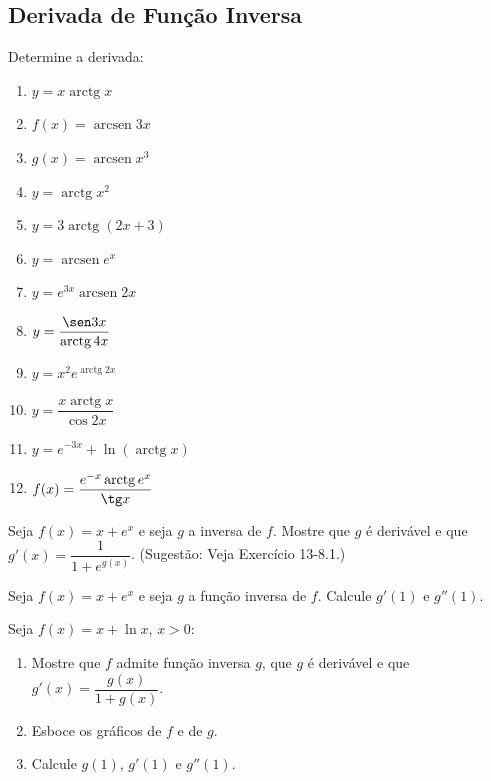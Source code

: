 \subsection{Derivada de Função Inversa}

\begin{exercicio}[1]
Determine a derivada:
\begin{enumerate}[label=\alph*)]
    \item $y = x\operatorname{arctg} x$
    \item $f(x) = \operatorname{arcsen} 3x$
    \item $g(x) = \operatorname{arcsen} x^3$
    \item $y = \operatorname{arctg} x^2$
    \item $y = 3\operatorname{arctg}(2x + 3)$
    \item $y = \operatorname{arcsen} e^x$
    \item $y = e^{3x}\operatorname{arcsen} 2x$
    \item $y = \dfrac{\sen 3x}{\operatorname{arctg} 4x}$
    \item $y = x^2 e^{\operatorname{arctg} 2x}$
    \item $y = \dfrac{x\operatorname{arctg} x}{\cos 2x}$
    \item $y = e^{-3x} + \ln(\operatorname{arctg} x)$
    \item $f(x) = \dfrac{e^{-x}\operatorname{arctg} e^x}{\tg x}$
\end{enumerate}
\end{exercicio}

\begin{exercicio}[2]
Seja $f(x) = x + e^x$ e seja $g$ a inversa de $f$. Mostre que $g$ é derivável e que $g'(x) = \dfrac{1}{1 + e^{g(x)}}$. (Sugestão: Veja Exercício 13-8.1.)
\end{exercicio}

\begin{exercicio}[3]
Seja $f(x) = x + e^x$ e seja $g$ a função inversa de $f$. Calcule $g'(1)$ e $g''(1)$.
\end{exercicio}

\begin{exercicio}[4]
Seja $f(x) = x + \ln x$, $x > 0$:
\begin{enumerate}[label=\alph*)]
    \item Mostre que $f$ admite função inversa $g$, que $g$ é derivável e que $g'(x) = \dfrac{g(x)}{1 + g(x)}$.
    \item Esboce os gráficos de $f$ e de $g$.
    \item Calcule $g(1)$, $g'(1)$ e $g''(1)$.
\end{enumerate}
\end{exercicio}

